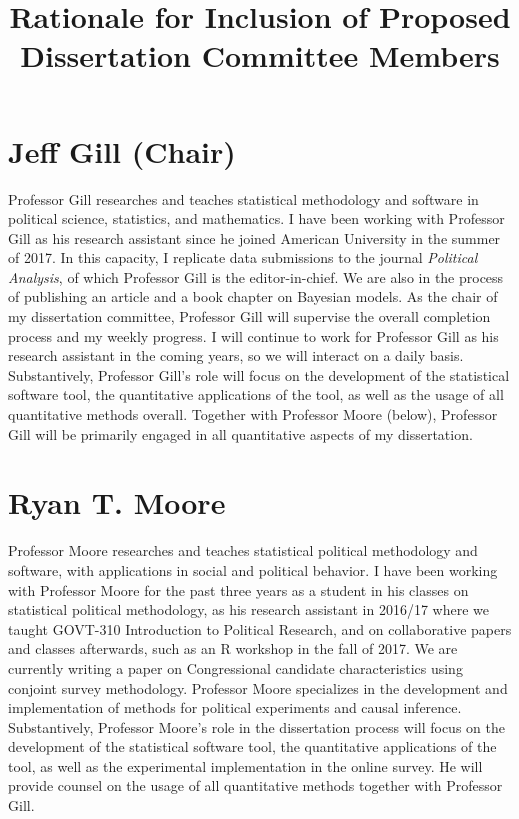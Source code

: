 \documentclass[11pt]{article}
\title{Rationale for Inclusion of Proposed Dissertation Committee Members}
\date{}
\begin{document}
\maketitle

\vspace{-1.6cm}

\section*{Jeff Gill (Chair)}

\vspace{0.3cm}

Professor Gill researches and teaches statistical methodology and software in political science, statistics, and mathematics. I have been working with Professor Gill as his research assistant since he joined American University in the summer of 2017. In this capacity, I replicate data submissions to the journal \textit{Political Analysis}, of which Professor Gill is the editor-in-chief. We are also in the process of publishing an article and a book chapter on Bayesian models. As the chair of my dissertation committee, Professor Gill will supervise the overall completion process and my weekly progress. I will continue to work for Professor Gill as his research assistant in the coming years, so we will interact on a daily basis. Substantively, Professor Gill's role will focus on the development of the statistical software tool, the quantitative applications of the tool, as well as the usage of all quantitative methods overall. Together with Professor Moore (below), Professor Gill will be primarily engaged in all quantitative aspects of my dissertation.

\section*{Ryan T. Moore}

\vspace{0.3cm}

Professor Moore researches and teaches statistical political methodology and software, with applications in social and political behavior. I have been working with Professor Moore for the past three years as a student in his classes on statistical political methodology, as his research assistant in 2016/17 where we taught GOVT-310 Introduction to Political Research, and on collaborative papers and classes afterwards, such as an R workshop in the fall of 2017. We are currently writing a paper on Congressional candidate characteristics using conjoint survey methodology. Professor Moore specializes in the development and implementation of methods for political experiments and causal inference. Substantively, Professor Moore's role in the dissertation process will focus on the development of the statistical software tool, the quantitative applications of the tool, as well as the experimental implementation in the online survey. He will provide counsel on the usage of all quantitative methods together with Professor Gill.
\end{document}
